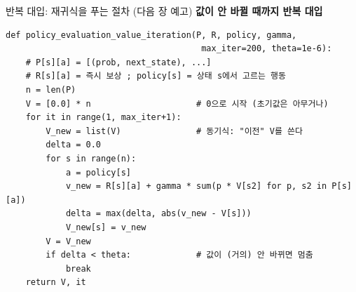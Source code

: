 \begin{frame}[fragile]{반복 대입: 재귀식을 푸는 절차 (다음 장 예고)}
  \textbf{값이 안 바뀔 때까지 반복 대입}
  \begin{lstlisting}
def policy_evaluation_value_iteration(P, R, policy, gamma,
                                       max_iter=200, theta=1e-6):
    # P[s][a] = [(prob, next_state), ...]
    # R[s][a] = 즉시 보상 ; policy[s] = 상태 s에서 고르는 행동
    n = len(P)
    V = [0.0] * n                     # 0으로 시작 (초기값은 아무거나)
    for it in range(1, max_iter+1):
        V_new = list(V)               # 동기식: "이전" V를 쓴다
        delta = 0.0
        for s in range(n):
            a = policy[s]
            v_new = R[s][a] + gamma * sum(p * V[s2] for p, s2 in P[s][a])
            delta = max(delta, abs(v_new - V[s]))
            V_new[s] = v_new
        V = V_new
        if delta < theta:             # 값이 (거의) 안 바뀌면 멈춤
            break
    return V, it
  \end{lstlisting}

\end{frame}
